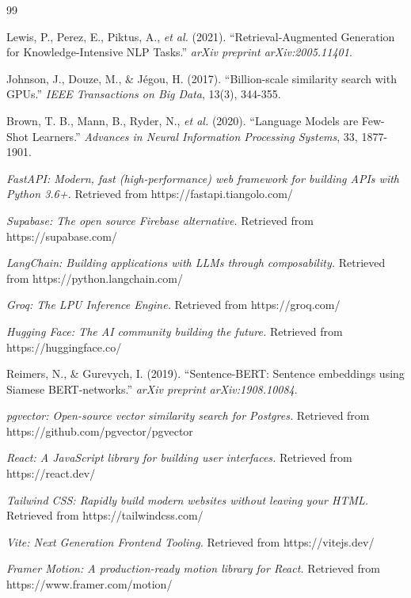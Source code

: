 \documentclass[10pt,twocolumn,a4paper]{article}
\begin{document}
\begin{thebibliography}{99}

Lewis, P., Perez, E., Piktus, A., \textit{et al.} (2021). 
``Retrieval-Augmented Generation for Knowledge-Intensive NLP Tasks.'' 
\textit{arXiv preprint arXiv:2005.11401}.

Johnson, J., Douze, M., \& Jégou, H. (2017). 
``Billion-scale similarity search with GPUs.'' 
\textit{IEEE Transactions on Big Data}, 13(3), 344-355.

Brown, T. B., Mann, B., Ryder, N., \textit{et al.} (2020). 
``Language Models are Few-Shot Learners.'' 
\textit{Advances in Neural Information Processing Systems}, 33, 1877-1901.

\textit{FastAPI: Modern, fast (high-performance) web framework for building APIs with Python 3.6+.} 
Retrieved from https://fastapi.tiangolo.com/

\textit{Supabase: The open source Firebase alternative.} 
Retrieved from https://supabase.com/

\textit{LangChain: Building applications with LLMs through composability.} 
Retrieved from https://python.langchain.com/

\textit{Groq: The LPU Inference Engine.} 
Retrieved from https://groq.com/

\textit{Hugging Face: The AI community building the future.} 
Retrieved from https://huggingface.co/

Reimers, N., \& Gurevych, I. (2019). 
``Sentence-BERT: Sentence embeddings using Siamese BERT-networks.'' 
\textit{arXiv preprint arXiv:1908.10084}.

\textit{pgvector: Open-source vector similarity search for Postgres.} 
Retrieved from https://github.com/pgvector/pgvector

\textit{React: A JavaScript library for building user interfaces.} 
Retrieved from https://react.dev/

\textit{Tailwind CSS: Rapidly build modern websites without leaving your HTML.} 
Retrieved from https://tailwindcss.com/

\textit{Vite: Next Generation Frontend Tooling.} 
Retrieved from https://vitejs.dev/

\textit{Framer Motion: A production-ready motion library for React.} 
Retrieved from https://www.framer.com/motion/

\end{thebibliography}
\end{document}
